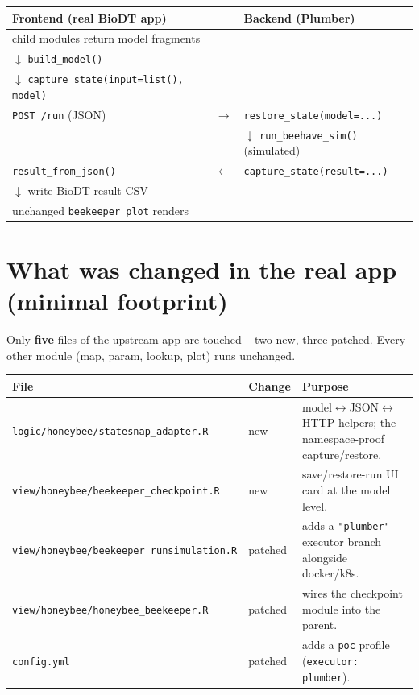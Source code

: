 \documentclass[12pt,a4paper]{article}
\begin{document}
\begin{center}
\footnotesize
\begin{tabular}{@{}lcl@{}}
\toprule
\textbf{Frontend (real BioDT app)} & & \textbf{Backend (Plumber)} \\
\midrule
child modules return model fragments & & \\
$\downarrow$ \texttt{build\_model()} & & \\
$\downarrow$ \texttt{capture\_state(input=list(), model)} & & \\
\texttt{POST /run} (JSON) & $\longrightarrow$ & \texttt{restore\_state(model=...)} \\
 & & $\downarrow$ \texttt{run\_beehave\_sim()} (simulated) \\
\texttt{result\_from\_json()} & $\longleftarrow$ & \texttt{capture\_state(result=...)} \\
$\downarrow$ write BioDT result CSV & & \\
unchanged \texttt{beekeeper\_plot} renders & & \\
\bottomrule
\end{tabular}
\end{center}

\section{What was changed in the real app (minimal footprint)}

Only \textbf{five} files of the upstream app are touched -- two new, three
patched. Every other module (map, param, lookup, plot) runs unchanged.

\begin{table}[h]\centering\footnotesize
\begin{tabular}{@{}llp{6.2cm}@{}}
\toprule
\textbf{File} & \textbf{Change} & \textbf{Purpose} \\
\midrule
\texttt{logic/honeybee/statesnap\_adapter.R} & new &
  model$\leftrightarrow$JSON$\leftrightarrow$HTTP helpers; the namespace-proof
  capture/restore. \\
\texttt{view/honeybee/beekeeper\_checkpoint.R} & new &
  save/restore-run UI card at the model level. \\
\texttt{view/honeybee/beekeeper\_runsimulation.R} & patched &
  adds a \texttt{"plumber"} executor branch alongside docker/k8s. \\
\texttt{view/honeybee/honeybee\_beekeeper.R} & patched &
  wires the checkpoint module into the parent. \\
\texttt{config.yml} & patched &
  adds a \texttt{poc} profile (\texttt{executor: plumber}). \\
\bottomrule
\end{tabular}
\end{table}
\end{document}
